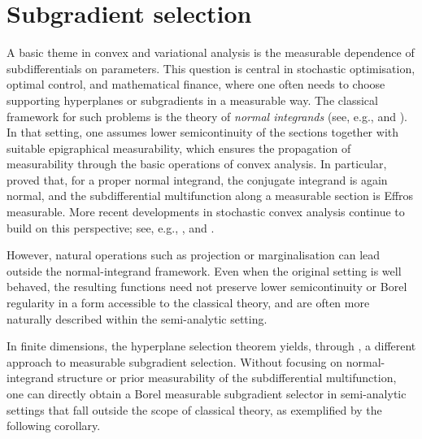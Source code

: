 \documentclass[10pt, a4paper]{article}
\begin{document}
\section{Subgradient selection}

A basic theme in convex and variational analysis is the measurable dependence of subdifferentials on parameters. This question is central in stochastic optimisation, optimal control, and mathematical finance, where one often needs to choose supporting hyperplanes or subgradients in a measurable way. The classical framework for such problems is the theory of \emph{normal integrands} (see, e.g., \cite{rockafellar1976integrands} and  \cite{castaing1977convex}). In that setting, one assumes lower semicontinuity of the sections together with suitable epigraphical measurability, which ensures  the propagation of measurability through the basic operations of convex analysis. In particular, \cite{hess1995measurability} proved that, for a proper normal integrand, the conjugate integrand is again normal, and the subdifferential multifunction along a measurable section is Effros measurable. More recent developments in stochastic convex analysis continue to build on this perspective; see, e.g., \cite{kiiski2017optional,pennanen2024convex}, and \cite{bui2024interchange}.

However, natural operations such as projection or marginalisation can lead outside the normal-integrand framework. Even when the original setting is well behaved, the resulting functions need not preserve lower semicontinuity or Borel regularity in a form accessible to the classical theory, and are often more naturally described within the semi-analytic setting.

In finite dimensions, the hyperplane selection theorem yields, through  , a different approach to measurable subgradient selection. Without focusing on normal-integrand structure or prior measurability of the subdifferential multifunction, one can directly obtain a Borel measurable subgradient selector in semi-analytic settings that fall outside the scope of classical theory, as exemplified by the following corollary.
\end{document}
